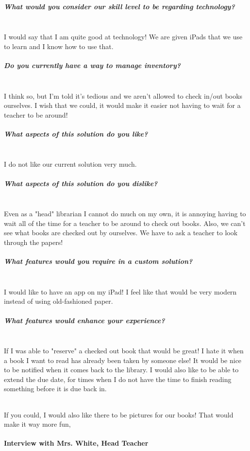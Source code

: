 \documentclass[../../../main.tex]{subfiles}
\begin{document}
\subparagraph{What would you consider our skill level to be regarding technology?}

\noindent \\ I would say that I am quite good at technology! We are given iPads that we use to learn and I know how to use that.

\subparagraph{Do you currently have a way to manage inventory?}

\noindent \\ I think so, but I'm told it's tedious and we aren't allowed to check in/out books ourselves. I wish that we could, it would make it easier not having to wait for a teacher to be around!

\subparagraph{What aspects of this solution do you like?}

\noindent \\ I do not like our current solution very much.

\subparagraph{What aspects of this solution do you dislike?}

\noindent \\ Even as a "head" librarian I cannot do much on my own, it is annoying having to wait all of the time for a teacher to be around to check out books.
Also, we can't see what books are checked out by ourselves. We have to ask a teacher to look through the papers!

\subparagraph{What features would you require in a custom solution?}

\noindent \\ I would like to have an app on my iPad! I feel like that would be very modern instead of using old-fashioned paper.

\subparagraph{What features would enhance your experience?}

\noindent \\ If I was able to "reserve" a checked out book that would be great! I hate it when a book I want to read has already been taken by someone else! It would be nice to be notified when it comes back to the library.
I would also like to be able to extend the due date, for times when I do not have the time to finish reading something before it is due back in.

\noindent \\ If you could, I would also like there to be pictures for our books! That would make it way more fun,

\paragraph{Interview with Mrs. White, Head Teacher}
\end{document}
